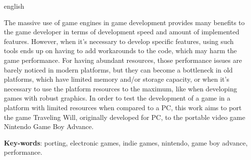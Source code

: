\begin{resumo}[Abstract]
 \begin{otherlanguage*}{english}

The massive use of game engines in game development provides many benefits to the game developer in terms of development speed and amount of implemented features. However, when it’s necessary to develop specific features, using such tools ends up on having to add workarounds to the code, which may harm the game performance. For having abundant resources, those performance issues are barely noticed in modern platforms, but they can become a bottleneck in old platforms, which have limited memory and/or storage capacity, or when it’s necessary to use the platform resources to the maximum, like when developing games with robust graphics. In order to test the development of a game in a platform with limited resources when compared to a PC, this work aims to port the game Traveling Will, originally developed for PC, to the portable video game Nintendo Game Boy Advance.

   \vspace{\onelineskip}

   \noindent
   \textbf{Key-words}: porting, electronic games, indie games, nintendo, game boy advance, performance.
 \end{otherlanguage*}
\end{resumo}
